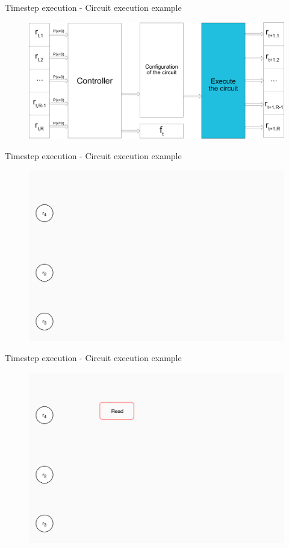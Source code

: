 \documentclass[xcolor={usenames}]{beamer}
\begin{document}
  \begin{frame}{Timestep execution - Circuit execution example}
  	\begin{figure}
  		\centering
  		\includegraphics[width=\textwidth]{../figures/timestep-nram-without-memory-execution-CIRCUIT.png}
  	\end{figure}
  \end{frame}
  \begin{frame}{Timestep execution - Circuit execution example}
  	\begin{figure}
  		\centering
  		\includegraphics[width=\textwidth]{../figures/example-circuit-0.png}
  	\end{figure}
  \end{frame}
  \begin{frame}{Timestep execution - Circuit execution example}
  	\begin{figure}
  		\centering
  		\includegraphics[width=\textwidth]{../figures/example-circuit-1.png}
  	\end{figure}
  \end{frame}
\end{document}
